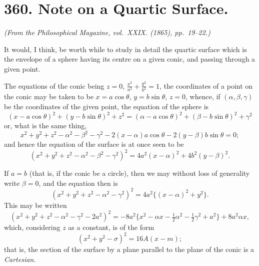 \documentclass[11pt,a4paper]{article}
\theoremstyle{plain}
\begin{document}
\vspace{1cm}

\section*{360. Note on a Quartic Surface.\quad [360]}
\label{sec:360}

\begin{flushright}
\textit{(From the Philosophical Magazine, vol.~XXIX. (1865), pp.~19--22.)}
\end{flushright}

It would, I think, be worth while to study in detail the quartic surface which is the envelope of a sphere having its centre on a given conic, and passing through a given point.

The equations of the conic being $z = 0$, $\frac{x^2}{a^2} + \frac{y^2}{b^2} = 1$, the coordinates of a point on the conic may be taken to be $x = a\cos\theta$, $y = b\sin\theta$, $z = 0$, whence, if $(\alpha, \beta, \gamma)$ be the coordinates of the given point, the equation of the sphere is
\[
(x - a\cos\theta)^2 + (y - b\sin\theta)^2 + z^2 = (\alpha - a\cos\theta)^2 + (\beta - b\sin\theta)^2 + \gamma^2
\]
or, what is the same thing,
\[
x^2 + y^2 + z^2 - \alpha^2 - \beta^2 - \gamma^2 - 2(x - \alpha)a\cos\theta - 2(y - \beta)b\sin\theta = 0;
\]
and hence the equation of the surface is at once seen to be
\[
(x^2 + y^2 + z^2 - \alpha^2 - \beta^2 - \gamma^2)^2 = 4a^2(x - \alpha)^2 + 4b^2(y - \beta)^2.
\]

If $a = b$ (that is, if the conic be a circle), then we may without loss of generality write $\beta = 0$, and the equation then is
\[
(x^2 + y^2 + z^2 - \alpha^2 - \gamma^2)^2 = 4a^2\{(x - \alpha)^2 + y^2\}.
\]
This may be written
\[
(x^2 + y^2 + z^2 - \alpha^2 - \gamma^2 - 2a^2)^2 = -8a^2\{x^2 - \alpha x - \tfrac12\alpha^2 - \tfrac12\gamma^2 + a^2\} + 8a^2\alpha x,
\]
which, considering $z$ as a constant, is of the form
\[
(x^2 + y^2 - \sigma)^2 = 16A(x - m);
\]
that is, the section of the surface by a plane parallel to the plane of the conic is a \textit{Cartesian}.
\end{document}
